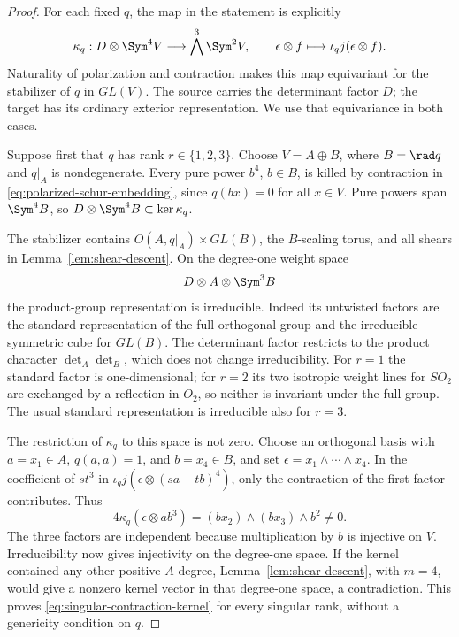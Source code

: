 \begin{proof}
For each fixed \(q\), the map in the statement is explicitly
\[
 \kappa_q:D\otimes\Sym^4V\longrightarrow\bigwedge^3\Sym^2V,
              \qquad \epsilon\otimes f\longmapsto
                     \iota_qj(\epsilon\otimes f).
\]
Naturality of polarization and contraction makes this map equivariant
for the stabilizer of \(q\) in \(GL(V)\).  The source carries
the determinant factor \(D\); the target has its ordinary exterior
representation.  We use that equivariance in both cases.

Suppose first that \(q\) has rank \(r\in\{1,2,3\}\).
Choose \(V=A\oplus B\), where \(B=\rad q\) and \(q|_A\)
is nondegenerate.  Every pure power \(b^4\), \(b\in B\),
is killed by contraction in
\eqref{eq:polarized-schur-embedding}, since \(q(bx)=0\) for
all \(x\in V\).  Pure powers span \(\Sym^4B\), so
\(D\otimes\Sym^4B\subset\ker\kappa_q\).

The stabilizer contains \(O(A,q|_A)\times GL(B)\), the
\(B\)-scaling torus, and all shears in
Lemma~\ref{lem:shear-descent}.  On the degree-one weight space
\[
 D\otimes A\otimes\Sym^3B
\]
the product-group representation is irreducible.  Indeed its untwisted
factors are the standard representation of the full orthogonal group
and the irreducible symmetric cube for \(GL(B)\).  The determinant
factor restricts to the product character \(\det_A\det_B\),
which does not change irreducibility.  For \(r=1\) the standard
factor is one-dimensional; for \(r=2\) its two isotropic weight
lines for \(SO_2\) are exchanged by a reflection in \(O_2\),
so neither is invariant under the full group.  The usual standard
representation is irreducible also for \(r=3\).

The restriction of \(\kappa_q\) to this space is not zero.
Choose an orthogonal basis with \(a=x_1\in A\),
\(q(a,a)=1\), and \(b=x_4\in B\), and set
\(\epsilon=x_1\wedge\cdots\wedge x_4\).
In the coefficient of \(st^3\) in
\(\iota_qj(\epsilon\otimes(sa+tb)^4)\), only the contraction
of the first factor contributes.  Thus
\[
 4\kappa_q(\epsilon\otimes ab^3)
       =(bx_2)\wedge(bx_3)\wedge b^2\ne0.
\]
The three factors are independent because multiplication by \(b\)
is injective on \(V\).  Irreducibility now gives injectivity on
the degree-one space.  If the kernel contained any other positive
\(A\)-degree, Lemma~\ref{lem:shear-descent}, with \(m=4\),
would give a nonzero kernel vector in that degree-one space, a
contradiction.  This proves \eqref{eq:singular-contraction-kernel}
for every singular rank, without a genericity condition on \(q\).


\end{proof}
